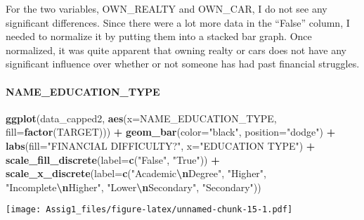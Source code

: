 \documentclass[
]{article}
\newenvironment{Shaded}{\begin{snugshade}}{\end{snugshade}}
\newcommand{\AttributeTok}[1]{\textcolor[rgb]{0.13,0.29,0.53}{#1}}
\newcommand{\FunctionTok}[1]{\textcolor[rgb]{0.13,0.29,0.53}{\textbf{#1}}}
\newcommand{\NormalTok}[1]{#1}
\newcommand{\SpecialCharTok}[1]{\textcolor[rgb]{0.81,0.36,0.00}{\textbf{#1}}}
\newcommand{\StringTok}[1]{\textcolor[rgb]{0.31,0.60,0.02}{#1}}
\begin{document}
For the two variables, OWN\_REALTY and OWN\_CAR, I do not see any
significant differences. Since there were a lot more data in the
``False'' column, I needed to normalize it by putting them into a
stacked bar graph. Once normalized, it was quite apparent that owning
realty or cars does not have any significant influence over whether or
not someone has had past financial struggles.

\hypertarget{name_education_type}{%
\paragraph{NAME\_EDUCATION\_TYPE}\label{name_education_type}}

\begin{Shaded}
\begin{Highlighting}[]
\FunctionTok{ggplot}\NormalTok{(data\_capped2, }\FunctionTok{aes}\NormalTok{(}\AttributeTok{x=}\NormalTok{NAME\_EDUCATION\_TYPE, }\AttributeTok{fill=}\FunctionTok{factor}\NormalTok{(TARGET))) }\SpecialCharTok{+}
  \FunctionTok{geom\_bar}\NormalTok{(}\AttributeTok{color=}\StringTok{"black"}\NormalTok{, }\AttributeTok{position=}\StringTok{"dodge"}\NormalTok{) }\SpecialCharTok{+}
  \FunctionTok{labs}\NormalTok{(}\AttributeTok{fill=}\StringTok{"FINANCIAL DIFFICULTY?"}\NormalTok{, }\AttributeTok{x=}\StringTok{"EDUCATION TYPE"}\NormalTok{) }\SpecialCharTok{+}
  \FunctionTok{scale\_fill\_discrete}\NormalTok{(}\AttributeTok{label=}\FunctionTok{c}\NormalTok{(}\StringTok{"False"}\NormalTok{, }\StringTok{"True"}\NormalTok{)) }\SpecialCharTok{+}
  \FunctionTok{scale\_x\_discrete}\NormalTok{(}\AttributeTok{label=}\FunctionTok{c}\NormalTok{(}\StringTok{"Academic}\SpecialCharTok{\textbackslash{}n}\StringTok{Degree"}\NormalTok{, }\StringTok{"Higher"}\NormalTok{, }\StringTok{"Incomplete}\SpecialCharTok{\textbackslash{}n}\StringTok{Higher"}\NormalTok{, }\StringTok{"Lower}\SpecialCharTok{\textbackslash{}n}\StringTok{Secondary"}\NormalTok{, }\StringTok{"Secondary"}\NormalTok{))}
\end{Highlighting}
\end{Shaded}

\texttt{[image: Assig1\_files/figure-latex/unnamed-chunk-15-1.pdf]}
\end{document}
